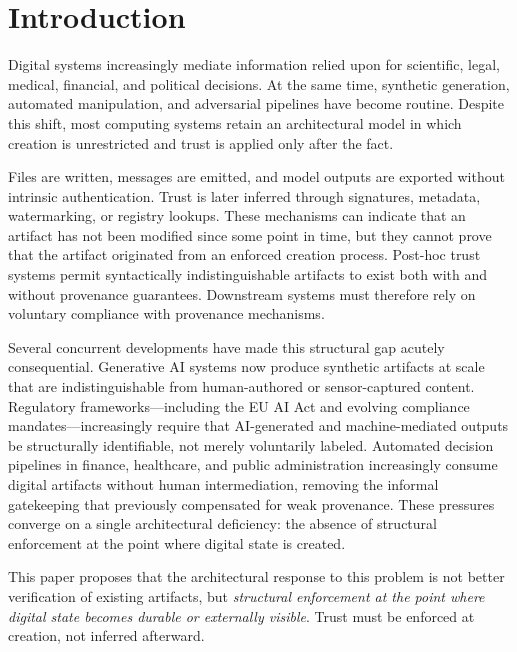 \documentclass[11pt,letterpaper]{article}
\theoremstyle{occplain}
\theoremstyle{occremark}
\begin{document}
\bigskip

\section{Introduction}
\label{sec:introduction}

Digital systems increasingly mediate information relied upon for scientific, legal, medical, financial, and political decisions. At the same time, synthetic generation, automated manipulation, and adversarial pipelines have become routine. Despite this shift, most computing systems retain an architectural model in which creation is unrestricted and trust is applied only after the fact.

Files are written, messages are emitted, and model outputs are exported without intrinsic authentication. Trust is later inferred through signatures, metadata, watermarking, or registry lookups. These mechanisms can indicate that an artifact has not been modified since some point in time, but they cannot prove that the artifact originated from an enforced creation process. Post-hoc trust systems permit syntactically indistinguishable artifacts to exist both with and without provenance guarantees. Downstream systems must therefore rely on voluntary compliance with provenance mechanisms.

Several concurrent developments have made this structural gap acutely consequential. Generative AI systems now produce synthetic artifacts at scale that are indistinguishable from human-authored or sensor-captured content. Regulatory frameworks---including the EU AI Act and evolving compliance mandates---increasingly require that AI-generated and machine-mediated outputs be structurally identifiable, not merely voluntarily labeled. Automated decision pipelines in finance, healthcare, and public administration increasingly consume digital artifacts without human intermediation, removing the informal gatekeeping that previously compensated for weak provenance. These pressures converge on a single architectural deficiency: the absence of structural enforcement at the point where digital state is created.

This paper proposes that the architectural response to this problem is not better verification of existing artifacts, but \emph{structural enforcement at the point where digital state becomes durable or externally visible}. Trust must be enforced at creation, not inferred afterward.
\end{document}
